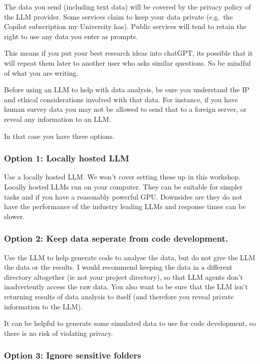 \documentclass[
  letterpaper,
  DIV=11,
  numbers=noendperiod]{scrreprt}
\begin{document}
The data you send (including text data) will be covered by the privacy
policy of the LLM provider. Some services claim to keep your data
private (e.g.~the Copilot subscription my University has). Public
services will tend to retain the right to use any data you enter as
prompts.

This means if you put your best research ideas into chatGPT, its
possible that it will repeat them later to another user who asks similar
questions. So be mindful of what you are writing.

Before using an LLM to help with data analysis, be sure you understand
the IP and ethical considerations involved with that data. For instance,
if you have human survey data you may not be allowed to send that to a
foreign server, or reveal any information to an LLM.

In that case you have three options.

\subsubsection{Option 1: Locally hosted
LLM}\label{option-1-locally-hosted-llm}

Use a locally hosted LLM. We won't cover setting these up in this
workshop. Locally hosted LLMs run on your computer. They can be suitable
for simpler tasks and if you have a reasonably powerful GPU. Downsides
are they do not have the performance of the industry leading LLMs and
response times can be slower.

\subsubsection{Option 2: Keep data seperate from code
development.}\label{option-2-keep-data-seperate-from-code-development.}

Use the LLM to help generate code to analyse the data, but do not give
the LLM the data or the results. I would recommend keeping the data in a
different directory altogether (ie not your project directory), so that
LLM agents don't inadvertently access the raw data. You also want to be
sure that the LLM isn't returning results of data analysis to itself
(and therefore you reveal private information to the LLM).

It can be helpful to generate some simulated data to use for code
development, so there is no risk of violating privacy.

\subsubsection{Option 3: Ignore sensitive
folders}\label{option-3-ignore-sensitive-folders}
\end{document}
